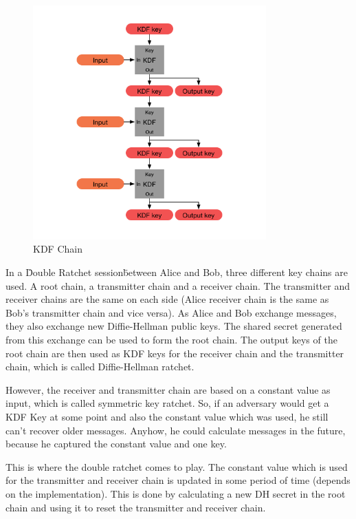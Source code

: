 \documentclass[12pt,oneside,a4paper,parskip]{scrbook}
\begin{document}
\begin{figure}[h]
	\centering
  \includegraphics[width=0.8\textwidth]{ressources/kdf_chain.png}
  \caption{KDF Chain}
  \label{KDF_Chain}
\end{figure}

In a \"Double Ratchet session\" between Alice and Bob, three different key chains are used. A root chain, a transmitter chain and a receiver chain. The transmitter and receiver chains are the same on each side (Alice receiver chain is the same as Bob's transmitter chain and vice versa). As Alice and Bob exchange messages, they also exchange new Diffie-Hellman public keys. The shared secret generated from this exchange can be used to form the root chain. The output keys of the root chain are then used as KDF keys for the receiver chain and the transmitter chain, which is called Diffie-Hellman ratchet.

However, the receiver and transmitter chain are based on a constant value as input, which is called symmetric key ratchet. So, if an adversary would get a KDF Key at some point and also the constant value which was used, he still can't recover older messages. Anyhow, he could calculate messages in the future, because he captured the constant value and one key. 

This is where the double ratchet comes to play. The constant value which is used for the transmitter and receiver chain is updated in some period of time (depends on the implementation). This is done by calculating a new DH secret in the root chain and using it to reset the transmitter and receiver chain. 
\end{document}
